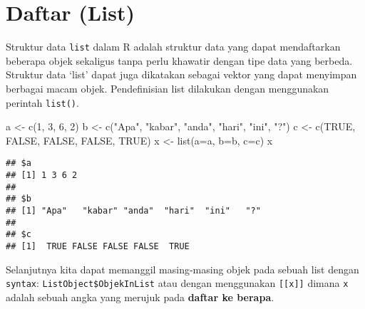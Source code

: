 \documentclass[
]{book}
\newenvironment{Shaded}{\begin{snugshade}}{\end{snugshade}}
\newcommand{\AttributeTok}[1]{\textcolor[rgb]{0.77,0.63,0.00}{#1}}
\newcommand{\ConstantTok}[1]{\textcolor[rgb]{0.00,0.00,0.00}{#1}}
\newcommand{\DecValTok}[1]{\textcolor[rgb]{0.00,0.00,0.81}{#1}}
\newcommand{\FunctionTok}[1]{\textcolor[rgb]{0.00,0.00,0.00}{#1}}
\newcommand{\NormalTok}[1]{#1}
\newcommand{\OtherTok}[1]{\textcolor[rgb]{0.56,0.35,0.01}{#1}}
\newcommand{\SpecialCharTok}[1]{\textcolor[rgb]{0.00,0.00,0.00}{#1}}
\newcommand{\StringTok}[1]{\textcolor[rgb]{0.31,0.60,0.02}{#1}}
\begin{document}
\hypertarget{list}{%
\section{Daftar (List)}\label{list}}

Struktur data \texttt{list} dalam R adalah struktur data yang dapat mendaftarkan beberapa objek sekaligus tanpa perlu khawatir dengan tipe data yang berbeda. Struktur data `list' dapat juga dikatakan sebagai vektor yang dapat menyimpan berbagai macam objek. Pendefinisian list dilakukan dengan menggunakan perintah \texttt{list()}.

\begin{Shaded}
\begin{Highlighting}[]
\NormalTok{a }\OtherTok{\textless{}{-}} \FunctionTok{c}\NormalTok{(}\DecValTok{1}\NormalTok{, }\DecValTok{3}\NormalTok{, }\DecValTok{6}\NormalTok{, }\DecValTok{2}\NormalTok{)}
\NormalTok{b }\OtherTok{\textless{}{-}} \FunctionTok{c}\NormalTok{(}\StringTok{"Apa"}\NormalTok{, }\StringTok{"kabar"}\NormalTok{, }\StringTok{"anda"}\NormalTok{, }\StringTok{"hari"}\NormalTok{, }\StringTok{"ini"}\NormalTok{, }\StringTok{"?"}\NormalTok{)}
\NormalTok{c }\OtherTok{\textless{}{-}} \FunctionTok{c}\NormalTok{(}\ConstantTok{TRUE}\NormalTok{, }\ConstantTok{FALSE}\NormalTok{, }\ConstantTok{FALSE}\NormalTok{, }\ConstantTok{FALSE}\NormalTok{, }\ConstantTok{TRUE}\NormalTok{)}
\NormalTok{x }\OtherTok{\textless{}{-}} \FunctionTok{list}\NormalTok{(}\AttributeTok{a=}\NormalTok{a, }\AttributeTok{b=}\NormalTok{b, }\AttributeTok{c=}\NormalTok{c)}
\NormalTok{x}
\end{Highlighting}
\end{Shaded}

\begin{verbatim}
## $a
## [1] 1 3 6 2
## 
## $b
## [1] "Apa"   "kabar" "anda"  "hari"  "ini"   "?"    
## 
## $c
## [1]  TRUE FALSE FALSE FALSE  TRUE
\end{verbatim}

Selanjutnya kita dapat memanggil masing-masing objek pada sebuah list dengan \texttt{syntax}: \texttt{ListObject\$ObjekInList} atau dengan menggunakan \texttt{{[}{[}x{]}{]}} dimana \texttt{x} adalah sebuah angka yang merujuk pada \textbf{daftar ke berapa}.

\begin{Shaded}
\end{Shaded}
\end{document}
